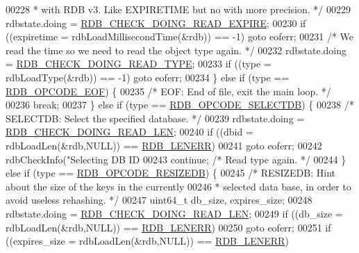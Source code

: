 \begin{DoxyCode}
{{{{{{{{{00228 \textcolor{comment}{             * with RDB v3. Like EXPIRETIME but no with more precision. */}
00229             rdbstate.doing = \hyperlink{redis-check-rdb_8c_a1ea6b327825b203156f25d5690203cc9}{RDB\_CHECK\_DOING\_READ\_EXPIRE};
00230             \textcolor{keywordflow}{if} ((expiretime = rdbLoadMillisecondTime(&rdb)) == -1) \textcolor{keywordflow}{goto} eoferr;
00231             \textcolor{comment}{/* We read the time so we need to read the object type again. */}
00232             rdbstate.doing = \hyperlink{redis-check-rdb_8c_aa0a7dfd3a3e0ac75d688d559a3704bc4}{RDB\_CHECK\_DOING\_READ\_TYPE};
00233             \textcolor{keywordflow}{if} ((type = rdbLoadType(&rdb)) == -1) \textcolor{keywordflow}{goto} eoferr;
00234         \} \textcolor{keywordflow}{else} \textcolor{keywordflow}{if} (type == \hyperlink{rdb_8h_af4c616d96f3dc8d44911f7fff2a712da}{RDB\_OPCODE\_EOF}) \{
00235             \textcolor{comment}{/* EOF: End of file, exit the main loop. */}
00236             \textcolor{keywordflow}{break};
00237         \} \textcolor{keywordflow}{else} \textcolor{keywordflow}{if} (type == \hyperlink{rdb_8h_a08e0489a0baf79997ee8411e850d6c70}{RDB\_OPCODE\_SELECTDB}) \{
00238             \textcolor{comment}{/* SELECTDB: Select the specified database. */}
00239             rdbstate.doing = \hyperlink{redis-check-rdb_8c_ad444ed91923ac86310ebd17eb5525cae}{RDB\_CHECK\_DOING\_READ\_LEN};
00240             \textcolor{keywordflow}{if} ((dbid = rdbLoadLen(&rdb,NULL)) == \hyperlink{rdb_8h_aa66b6ad7261656029e6a67cf78432b2d}{RDB\_LENERR})
00241                 \textcolor{keywordflow}{goto} eoferr;
00242             rdbCheckInfo(\textcolor{stringliteral}{"Selecting DB ID %
00243             \textcolor{keywordflow}{continue}; \textcolor{comment}{/* Read type again. */}
00244         \} \textcolor{keywordflow}{else} \textcolor{keywordflow}{if} (type == \hyperlink{rdb_8h_ad1f63cee59a3066446beecae389a8758}{RDB\_OPCODE\_RESIZEDB}) \{
00245             \textcolor{comment}{/* RESIZEDB: Hint about the size of the keys in the currently}
00246 \textcolor{comment}{             * selected data base, in order to avoid useless rehashing. */}
00247             uint64\_t db\_size, expires\_size;
00248             rdbstate.doing = \hyperlink{redis-check-rdb_8c_ad444ed91923ac86310ebd17eb5525cae}{RDB\_CHECK\_DOING\_READ\_LEN};
00249             \textcolor{keywordflow}{if} ((db\_size = rdbLoadLen(&rdb,NULL)) == \hyperlink{rdb_8h_aa66b6ad7261656029e6a67cf78432b2d}{RDB\_LENERR})
00250                 \textcolor{keywordflow}{goto} eoferr;
00251             \textcolor{keywordflow}{if} ((expires\_size = rdbLoadLen(&rdb,NULL)) == \hyperlink{rdb_8h_aa66b6ad7261656029e6a67cf78432b2d}{RDB\_LENERR})
}}}}}}}}}}
\end{DoxyCode}

